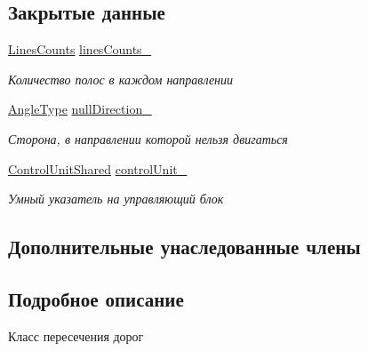 \subsection*{Закрытые данные}
\begin{DoxyCompactItemize}
\item 
\mbox{\label{classrtm_1_1_crossroad_object_a0c335da8c54d6927a9ae1a9a16a908ce}} 
\hyperlink{namespacertm_a14457f3088a92b86a96686b72d3e4eea}{Lines\+Counts} \hyperlink{classrtm_1_1_crossroad_object_a0c335da8c54d6927a9ae1a9a16a908ce}{lines\+Counts\+\_\+}
\begin{DoxyCompactList}\small\item\em Количество полос в каждом направлении \end{DoxyCompactList}\item 
\mbox{\label{classrtm_1_1_crossroad_object_a8e3056ac82578b7d113d26a4926b6258}} 
\hyperlink{namespacertm_a69dc82b16a0148c10962caa83d930f89}{Angle\+Type} \hyperlink{classrtm_1_1_crossroad_object_a8e3056ac82578b7d113d26a4926b6258}{null\+Direction\+\_\+}
\begin{DoxyCompactList}\small\item\em Сторона, в направлении которой нельзя двигаться \end{DoxyCompactList}\item 
\mbox{\label{classrtm_1_1_crossroad_object_a77bfe06c0b30c3837cb92e49ce0a5bca}} 
\hyperlink{namespacertm_a64296d558b2fa02bbf5870afffd61fd9}{Control\+Unit\+Shared} \hyperlink{classrtm_1_1_crossroad_object_a77bfe06c0b30c3837cb92e49ce0a5bca}{control\+Unit\+\_\+}
\begin{DoxyCompactList}\small\item\em Умный указатель на управляющий блок \end{DoxyCompactList}\end{DoxyCompactItemize}
\subsection*{Дополнительные унаследованные члены}


\subsection{Подробное описание}
Класс пересечения дорог 

